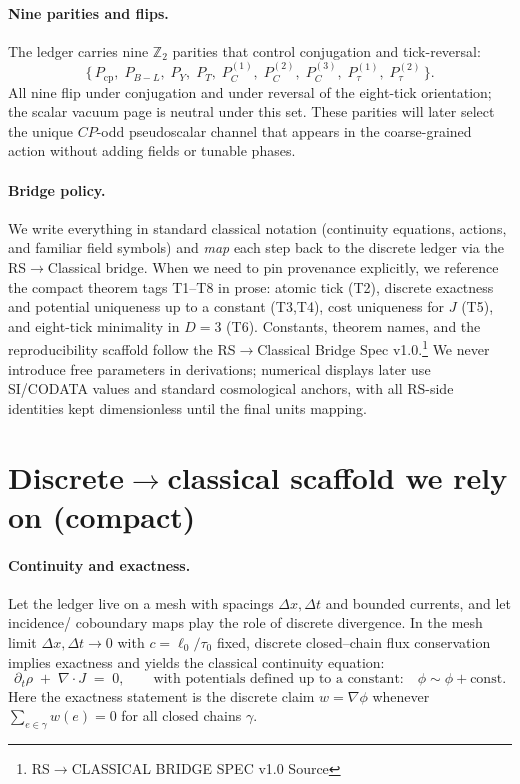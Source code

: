 \documentclass[11pt]{article}
\begin{document}
\medskip

\paragraph{Nine parities and flips.} 
The ledger carries nine $\mathbb{Z}_2$ parities that control conjugation and tick-reversal:
\[
\{\,P_{\mathrm{cp}},\;P_{B-L},\;P_Y,\;P_T,\;P_C^{(1)},\;P_C^{(2)},\;P_C^{(3)},\;P_\tau^{(1)},\;P_\tau^{(2)}\,\}.
\]
All nine flip under conjugation and under reversal of the eight-tick orientation; the scalar vacuum page is neutral under this set. These parities will later select the unique $CP$-odd pseudoscalar channel that appears in the coarse-grained action without adding fields or tunable phases.

\medskip

\paragraph{Bridge policy.} 
We write everything in standard classical notation (continuity equations, actions, and familiar field symbols) and \emph{map} each step back to the discrete ledger via the RS$\to$Classical bridge. When we need to pin provenance explicitly, we reference the compact theorem tags T1--T8 in prose: atomic tick (T2), discrete exactness and potential uniqueness up to a constant (T3,T4), cost uniqueness for $J$ (T5), and eight-tick minimality in $D{=}3$ (T6). Constants, theorem names, and the reproducibility scaffold follow the RS$\to$Classical Bridge Spec v1.0.\footnote{RS$\to$CLASSICAL BRIDGE SPEC v1.0 Source} We never introduce free parameters in derivations; numerical displays later use SI/CODATA values and standard cosmological anchors, with all RS-side identities kept dimensionless until the final units mapping.

\section{Discrete$\to$classical scaffold we rely on (compact)}

\paragraph{Continuity and exactness.}
Let the ledger live on a mesh with spacings \(\Delta x,\Delta t\) and bounded currents, and let incidence/ coboundary maps play the role of discrete divergence. In the mesh limit \(\Delta x,\Delta t\to 0\) with \(c=\ell_0/\tau_0\) fixed, discrete closed–chain flux conservation implies exactness and yields the classical continuity equation:
\begin{equation}
  \partial_t \rho \;+\; \nabla\!\cdot J \;=\; 0,
  \qquad\text{with potentials defined up to a constant:}\quad
  \phi \sim \phi + \text{const}.
\end{equation}
Here the exactness statement is the discrete claim \(w=\nabla \phi\) whenever \(\sum_{e\in\gamma} w(e)=0\) for all closed chains \(\gamma\).
\end{document}
